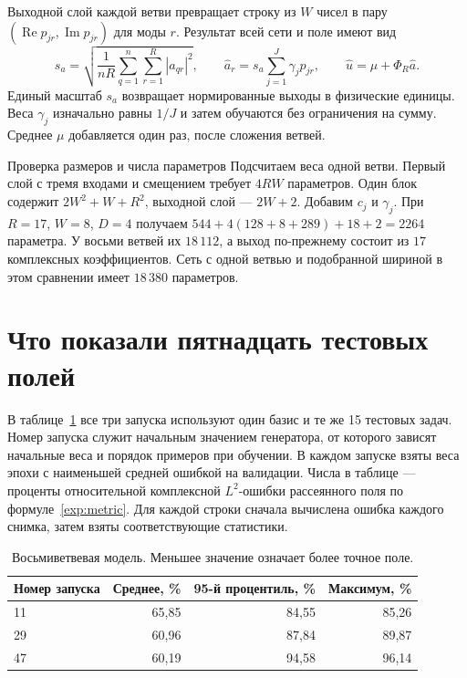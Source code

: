 Выходной слой каждой ветви превращает строку из $W$ чисел в пару
$(\operatorname{Re}p_{jr},\operatorname{Im}p_{jr})$ для моды $r$.
Результат всей сети и поле имеют вид
\[
 s_a=\sqrt{\frac{1}{nR}\sum_{q=1}^n\sum_{r=1}^R|a_{qr}|^2},\qquad
 \widehat a_r=s_a\sum_{j=1}^J\gamma_j p_{jr},\qquad
 \widehat u=\mu+\Phi_R\widehat a.
\]
Единый масштаб $s_a$ возвращает нормированные выходы в физические единицы.
Веса $\gamma_j$ изначально равны $1/J$ и затем обучаются без ограничения
на сумму. Среднее $\mu$ добавляется один раз, после сложения ветвей.

\begin{worked}{Проверка размеров и числа параметров}
Подсчитаем веса одной ветви. Первый слой с тремя входами и смещением
требует $4RW$ параметров. Один блок содержит $2W^2+W+R^2$, выходной
слой --- $2W+2$. Добавим $c_j$ и $\gamma_j$. При $R=17$, $W=8$, $D=4$
получаем $544+4(128+8+289)+18+2=2264$ параметра.
У восьми ветвей их $18\,112$, а выход по-прежнему состоит из $17$
комплексных коэффициентов. Сеть с одной ветвью и подобранной шириной
в этом сравнении имеет $18\,380$ параметров.
\end{worked}

\clearpage
\section{Что показали пятнадцать тестовых полей}
\label{adv:comparison}

В таблице~\ref{adv:results} все три запуска используют один базис и те же
15 тестовых задач. Номер запуска служит начальным значением генератора,
от которого зависят начальные веса и порядок примеров при обучении.
В каждом запуске взяты веса эпохи с наименьшей средней ошибкой
на валидации. Числа в таблице --- проценты относительной комплексной
$L^2$-ошибки рассеянного поля по формуле~\eqref{exp:metric}. Для каждой строки
сначала вычислена ошибка каждого снимка, затем взяты соответствующие статистики.

\begin{table}[htbp]
\centering
\caption{Восьмиветвевая модель. Меньшее значение означает более точное поле.}
\label{adv:results}
\begin{tabular}{@{}lrrr@{}}
\toprule
Номер запуска & Среднее, \% & 95-й процентиль, \% & Максимум, \%\\
\midrule
11 & 65,85 & 84,55 & 85,26\\
29 & 60,96 & 87,84 & 89,87\\
47 & 60,19 & 94,58 & 96,14\\
\bottomrule
\end{tabular}
\end{table}

